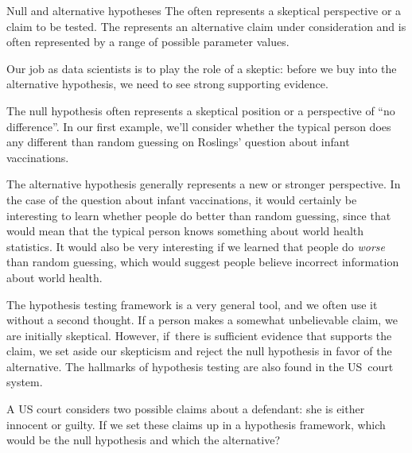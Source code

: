 \begin{onebox}{Null and alternative hypotheses}
  The  often represents
  a skeptical perspective or a claim to be tested.
  The  represents an
  alternative claim under consideration and is often
  represented by a range of possible parameter values.
  \stdvspace{}
  
  Our job as data scientists is to play the role of a skeptic:
  before we buy into the alternative hypothesis, we need to
  see strong supporting evidence.
\end{onebox}

The null hypothesis often represents a skeptical position
or a perspective of ``no difference''.
In our first example, we'll consider whether
the typical person does any different than random guessing
on Roslings' question about infant vaccinations.

The alternative hypothesis generally represents a new
or stronger perspective. In the case of the question
about infant vaccinations,
it would certainly be interesting to learn whether
people do better than random guessing, since that would
mean that the typical person knows something about
world health statistics.
It would also be very interesting if we learned
that people do \emph{worse} than random guessing,
which would suggest people believe
incorrect information about world health.

The hypothesis testing framework is a very general tool, and we often use it without a second thought. If a person makes a somewhat unbelievable claim, we are initially skeptical. However, if~there is sufficient evidence that supports the claim, we set aside our skepticism and reject the null hypothesis in favor of the alternative. The hallmarks of hypothesis testing are also found in the US~court system. 

\begin{exercisewrap}
\begin{nexercise} \label{hypTestCourtExample}
A US court considers two possible claims about a defendant: she is either innocent or guilty. If we set these claims up in a hypothesis framework, which would be the null hypothesis and which the alternative?\footnotemark
\end{nexercise}
\end{exercisewrap}

